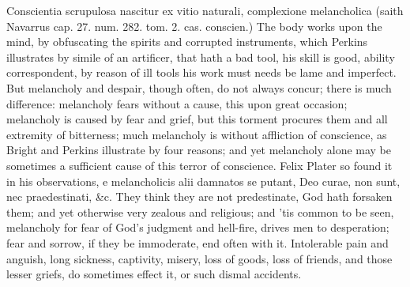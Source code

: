 {Conscientia scrupulosa nascitur ex vitio naturali, complexione
melancholica (saith Navarrus cap. 27. num. 282. tom. 2. cas. conscien.)
The body works upon the mind, by obfuscating the spirits and corrupted
instruments, which Perkins illustrates by simile of an artificer,
that hath a bad tool, his skill is good, ability correspondent, by
reason of ill tools his work must needs be lame and imperfect. But
melancholy and despair, though often, do not always concur; there is
much difference: melancholy fears without a cause, this upon great
occasion; melancholy is caused by fear and grief, but this torment
procures them and all extremity of bitterness; much melancholy is
without affliction of conscience, as Bright and Perkins
illustrate by four reasons; and yet melancholy alone may be sometimes a
sufficient cause of this terror of conscience. Felix Plater so
found it in his observations, e melancholicis alii damnatos se putant,
Deo curae, non sunt, nec praedestinati, \&c. They think they are not
predestinate, God hath forsaken them; and yet otherwise very zealous
and religious; and 'tis common to be seen, melancholy for fear of God's
judgment and hell-fire, drives men to desperation; fear and sorrow, if
they be immoderate, end often with it. Intolerable pain and anguish,
long sickness, captivity, misery, loss of goods, loss of friends, and
those lesser griefs, do sometimes effect it, or such dismal accidents.

}
